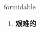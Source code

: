 
\begin{frame}
{\huge formidable}
\begin{center}
\begin{enumerate}\Large
  \item \textbf{艰难的}
\end{enumerate}
\end{center}
\end{frame}
